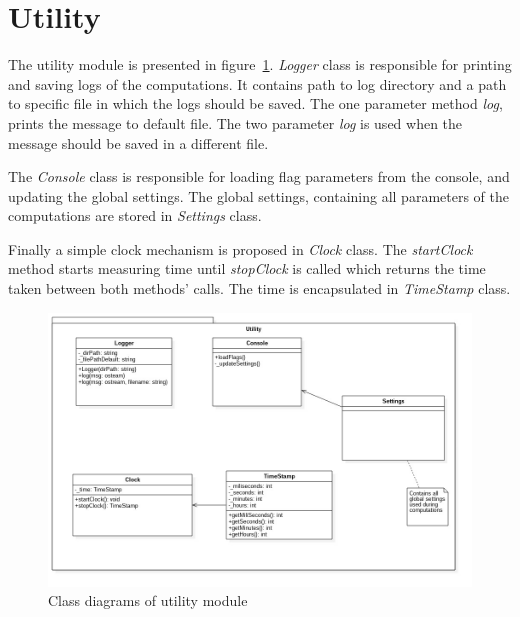 \documentclass{mini}
\begin{document}
\section{Utility}

The utility module is presented in figure~\ref{fig:utility_class}. \textit{Logger} class is responsible for printing and saving logs of the computations. It contains path to log directory and a path to specific file in which the logs should be saved. The one parameter method \textit{log}, prints the message to default file. The two parameter \textit{log} is used when the message should be saved in a different file.

The \textit{Console} class is responsible for loading flag parameters from the console, and updating the global settings. The global settings, containing all parameters of the computations are stored in \textit{Settings} class.

Finally a simple clock mechanism is proposed in \textit{Clock} class. The \textit{startClock} method starts measuring time until \textit{stopClock} is called which returns the time taken between both methods' calls. The time is encapsulated in \textit{TimeStamp} class.


%
%
\begin{figure}[H]
    \centering
    \includegraphics[width=1.0\textwidth]{images/utility_class.jpg}
    \caption{Class diagrams of utility module}
    \label{fig:utility_class}
\end{figure}
\end{document}
